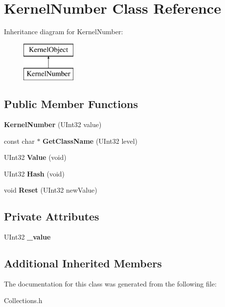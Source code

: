 \hypertarget{class_kernel_number}{}\section{Kernel\+Number Class Reference}
\label{class_kernel_number}
Inheritance diagram for Kernel\+Number\+:\begin{figure}[H]
\begin{center}
\leavevmode
\includegraphics[height=2.000000cm]{class_kernel_number}
\end{center}
\end{figure}
\subsection*{Public Member Functions}
\begin{DoxyCompactItemize}
\item 
\mbox{\label{class_kernel_number_a392f31c0ca350f661a95bc688fa64539}} 
{\bfseries Kernel\+Number} (U\+Int32 value)
\item 
\mbox{\label{class_kernel_number_a55dcbd119b176c2f3f1bf1f6eab32c07}} 
const char $\ast$ {\bfseries Get\+Class\+Name} (U\+Int32 level)
\item 
\mbox{\label{class_kernel_number_ab967352bece230448d48d0d1b0b95822}} 
U\+Int32 {\bfseries Value} (void)
\item 
\mbox{\label{class_kernel_number_a1f2c92ec7ee4f64373824a877c0f84c8}} 
U\+Int32 {\bfseries Hash} (void)
\item 
\mbox{\label{class_kernel_number_a824ceb10453c8c71a62c8fb01df683b7}} 
void {\bfseries Reset} (U\+Int32 new\+Value)
\end{DoxyCompactItemize}
\subsection*{Private Attributes}
\begin{DoxyCompactItemize}
\item 
\mbox{\label{class_kernel_number_aeb87d393d8a0c181690aea2e09fe7e37}} 
U\+Int32 {\bfseries \+\_\+value}
\end{DoxyCompactItemize}
\subsection*{Additional Inherited Members}


The documentation for this class was generated from the following file\+:\begin{DoxyCompactItemize}
\item 
Collections.\+h\end{DoxyCompactItemize}
